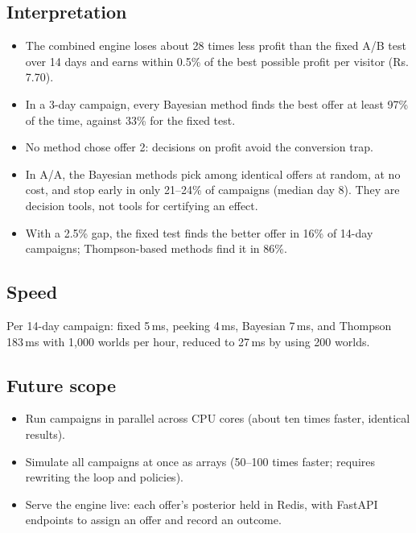 \documentclass[11pt,a4paper]{article}
\newcommand{\Rs}{Rs.\,}
\newcommand{\jpart}[1]{\subsection*{#1}}
\begin{document}
\jpart{Interpretation}
\begin{itemize}
  \item The combined engine loses about 28 times less profit than the fixed A/B test over 14 days and earns
        within 0.5\% of the best possible profit per visitor (\Rs 7.70).
  \item In a 3-day campaign, every Bayesian method finds the best offer at least 97\% of the time, against
        33\% for the fixed test.
  \item No method chose offer 2: decisions on profit avoid the conversion trap.
  \item In A/A, the Bayesian methods pick among identical offers at random, at no cost, and stop early in
        only 21--24\% of campaigns (median day 8). They are decision tools, not tools for certifying an effect.
  \item With a 2.5\% gap, the fixed test finds the better offer in 16\% of 14-day campaigns; Thompson-based
        methods find it in 86\%.
\end{itemize}

\jpart{Speed}
Per 14-day campaign: fixed 5\,ms, peeking 4\,ms, Bayesian 7\,ms, and Thompson 183\,ms with 1{,}000 worlds
per hour, reduced to 27\,ms by using 200 worlds.

\jpart{Future scope}
\begin{itemize}
  \item Run campaigns in parallel across CPU cores (about ten times faster, identical results).
  \item Simulate all campaigns at once as arrays (50--100 times faster; requires rewriting the loop and policies).
  \item Serve the engine live: each offer's posterior held in Redis, with FastAPI endpoints to assign an
        offer and record an outcome.
\end{itemize}
\end{document}
